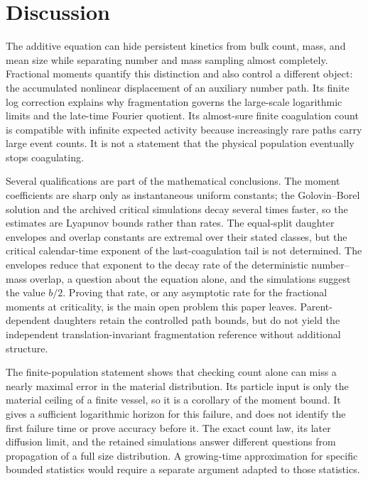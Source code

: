 \section{Discussion}
\label{sec:discussion}

The additive equation can hide persistent kinetics from bulk count,
mass, and mean size while separating number and mass sampling almost
completely. Fractional moments quantify this distinction and also
control a different object: the accumulated nonlinear displacement
of an auxiliary number path. Its finite log correction explains why
fragmentation governs the large-scale logarithmic limits and the
late-time Fourier quotient. Its almost-sure finite coagulation count
is compatible with infinite expected activity because increasingly
rare paths carry large event counts. It is not a statement that the
physical population eventually stops coagulating.

Several qualifications are part of the mathematical conclusions.
The moment coefficients are sharp only as instantaneous uniform
constants; the Golovin--Borel solution and the archived critical
simulations decay several times faster, so the estimates are Lyapunov
bounds rather than rates. The equal-split daughter envelopes and
overlap constants are extremal over their stated classes, but the
critical calendar-time exponent of the last-coagulation tail is not
determined. The envelopes reduce that exponent to the decay rate of
the deterministic number--mass overlap, a question about the equation
alone, and the simulations suggest the value $b/2$. Proving that rate,
or any asymptotic rate for the fractional moments at criticality, is
the main open problem this paper leaves.
Parent-dependent daughters retain the controlled path bounds, but
do not yield the independent translation-invariant fragmentation
reference without additional structure.

The finite-population statement shows that checking count alone can
miss a nearly maximal error in the material distribution. Its particle
input is only the material ceiling of a finite vessel, so it is a
corollary of the moment bound. It gives a sufficient logarithmic
horizon for this failure, and does not identify the first failure time or prove accuracy
before it. The exact count
law, its later diffusion limit, and the retained simulations answer
different questions from propagation of a full size distribution.
A growing-time approximation for specific bounded statistics would
require a separate argument adapted to those statistics.

